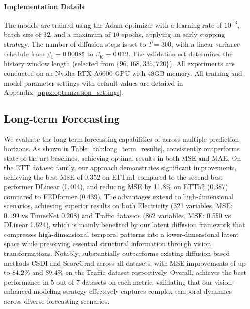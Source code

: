 \paragraph{Implementation Details} %
The models are trained using the Adam optimizer with a learning rate of $10^{-3}$, batch size of $32$, and a maximum of $10$ epochs, applying an early stopping strategy. The number of diffusion steps is set to $T=300$, with a linear variance schedule from $\beta_1=0.00085$ to $\beta_K=0.012$. The validation set determines the history window length (selected from $\{96, 168, 336, 720\}$). All experiments are conducted on an Nvidia RTX A6000 GPU with 48GB memory. All training and model parameter settings with default values are detailed in Appendix~\ref{appx:optimization_settings}.
\subsection{Long-term Forecasting}
We evaluate the long-term forecasting capabilities of \model across multiple prediction horizons. As shown in Table~\ref{tab:long_term_results}, \model consistently outperforms state-of-the-art baselines, achieving optimal results in both MSE and MAE. On the ETT dataset family, our approach demonstrates significant improvements, achieving the best MSE of 0.352 on ETTm1 compared to the second-best performer DLinear (0.404), and reducing MSE by 11.8\% on ETTh2 (0.387) compared to FEDformer (0.439). The advantages extend to high-dimensional scenarios, achieving superior results on both Electricity (321 variables, MSE: 0.199 vs TimesNet 0.208) and Traffic datasets (862 variables, MSE: 0.550 vs DLinear 0.624), which is mainly benefited by our latent diffusion framework that compresses high-dimensional temporal patterns into a lower-dimensional latent space while preserving essential structural information through vision transformations. Notably, \model substantially outperforms existing diffusion-based methods CSDI and ScoreGrad across all datasets, with MSE improvements of up to 84.2\% and 89.4\% on the Traffic dataset respectively. Overall, \model achieves the best performance in 5 out of 7 datasets on each metric, validating that our vision-enhanced modeling strategy effectively captures complex temporal dynamics across diverse forecasting scenarios. %

